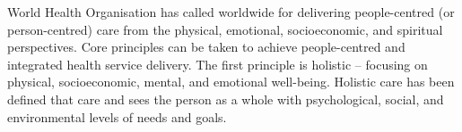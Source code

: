 \documentclass[12pt, a4paper]{article}
\begin{document}
%
World Health Organisation has called worldwide for delivering people-centred (or person-centred) care from the physical, emotional, socioeconomic, and spiritual perspectives\citep{WHO2015}\citep{Ling-ChengMong2021}.
Core principles can be taken to achieve people-centred and integrated health service delivery. 
The first principle is holistic – focusing on physical, socioeconomic, mental, and emotional well-being. 
Holistic care has been defined that care and sees the person as a whole with psychological, social, and environmental levels of needs and goals.


\end{document}
